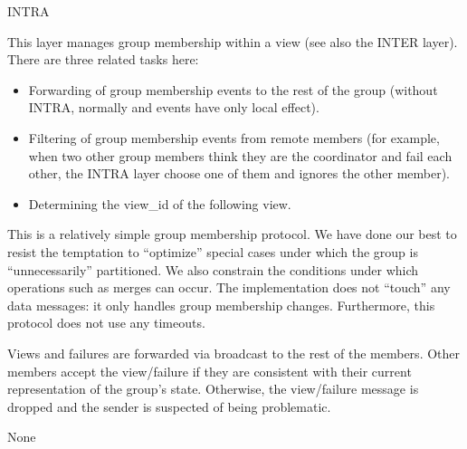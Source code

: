 \begin{Layer}{INTRA}

This layer manages group membership within a view (see also the INTER layer).
There are three related tasks here:
\begin{itemize}
\item
Forwarding of group membership events to the rest of the group
(without INTRA, normally  and  events have only local
effect).
\item 
Filtering of group membership events from remote members (for
example, when two other group members think they are the coordinator
and fail each other, the INTRA layer choose one of them and ignores
the other member).
\item
Determining the view\_id of the following view.
\end{itemize}

\begin{Protocol}
This is a relatively simple group membership protocol.  We have done our
best to resist the temptation to ``optimize'' special cases under which the
group is ``unnecessarily'' partitioned.  We also constrain the conditions
under which operations such as merges can occur.  The implementation does
not ``touch'' any data messages: it only handles group membership changes.
Furthermore, this protocol does not use any timeouts.

Views and failures are forwarded via broadcast to the rest of the members.
Other members accept the view/failure if they are consistent with their
current representation of the group's state.  Otherwise, the view/failure
message is dropped and the sender is suspected of being problematic. 
\end{Protocol}

\begin{Parameters}
\item None
\end{Parameters}


\end{Layer}
